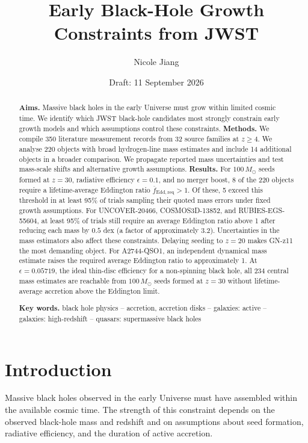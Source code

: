 \documentclass[11pt]{article}
\title{\textbf{Early Black-Hole Growth Constraints from JWST}}
\author{Nicole Jiang}
\date{Draft: 11 September 2026}
\begin{document}
\maketitle

\begin{abstract}
\textbf{Aims.} Massive black holes in the early Universe must grow within limited
cosmic time. We identify which JWST black-hole candidates most strongly constrain
early growth models and which assumptions control these constraints.
\textbf{Methods.} We compile 350 literature measurement records from 32 source
families at $z\geq4$. We analyse 220 objects with broad hydrogen-line mass
estimates and include 14 additional objects in a broader comparison. We propagate
reported mass uncertainties and test mass-scale shifts and alternative growth
assumptions.
\textbf{Results.} For $100\,M_\odot$ seeds formed at $z=30$, radiative efficiency
$\epsilon=0.1$, and no merger boost, 8 of the 220 objects require a lifetime-average
Eddington ratio $\overline{f}_{\mathrm{Edd,req}}>1$. Of these, 5 exceed this threshold
in at least 95\% of trials sampling their quoted mass errors under fixed growth
assumptions. For UNCOVER-20466, COSMOS3D-13852, and RUBIES-EGS-55604, at least
95\% of trials still require an average Eddington ratio above 1 after
reducing each mass by $0.5$ dex (a factor of approximately 3.2).
Uncertainties in the mass estimators also affect these constraints.
Delaying seeding to $z=20$ makes GN-z11 the most demanding object.
For A2744-QSO1, an independent dynamical mass estimate raises the required
average Eddington ratio to approximately 1.
At $\epsilon=0.05719$, the ideal thin-disc efficiency for a
non-spinning black hole, all 234 central mass estimates are reachable from
$100\,M_\odot$ seeds formed at $z=30$ without lifetime-average accretion above
the Eddington limit.

\smallskip
\noindent\textbf{Key words.} black hole physics -- accretion, accretion disks --
galaxies: active -- galaxies: high-redshift -- quasars: supermassive black holes
\end{abstract}

\section{Introduction}

Massive black holes observed in the early Universe must have assembled within
the available cosmic time. The strength of this constraint depends on the observed
black-hole mass and redshift and on assumptions about seed formation,
radiative efficiency, and the duration of active accretion.
\end{document}
